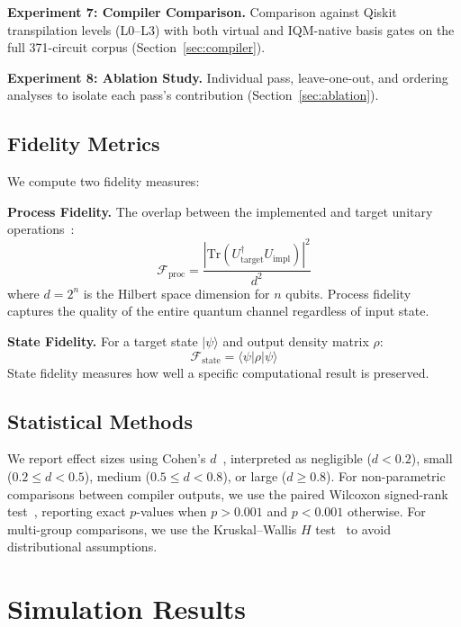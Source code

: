 \documentclass[sigconf,nonacm]{acmart}
\newcommand{\ket}[1]{|#1\rangle}
\newcommand{\bra}[1]{\langle#1|}
\newcommand{\fid}{\mathcal{F}}
\begin{document}
\textbf{Experiment 7: Compiler Comparison.} Comparison against Qiskit transpilation levels (L0--L3) with both virtual and IQM-native basis gates on the full 371-circuit corpus (Section~\ref{sec:compiler}).

\textbf{Experiment 8: Ablation Study.} Individual pass, leave-one-out, and ordering analyses to isolate each pass's contribution (Section~\ref{sec:ablation}).

\subsection{Fidelity Metrics}

We compute two fidelity measures:

\textbf{Process Fidelity.} The overlap between the implemented and target unitary operations~\cite{nielsen2010quantum}:
\begin{equation}
    \fid_{\text{proc}} = \frac{|\text{Tr}(U_{\text{target}}^{\dagger} U_{\text{impl}})|^2}{d^2}
\end{equation}
where $d = 2^n$ is the Hilbert space dimension for $n$ qubits. Process fidelity captures the quality of the entire quantum channel regardless of input state.

\textbf{State Fidelity.} For a target state $\ket{\psi}$ and output density matrix $\rho$:
\begin{equation}
    \fid_{\text{state}} = \bra{\psi}\rho\ket{\psi}
\end{equation}
State fidelity measures how well a specific computational result is preserved.

\subsection{Statistical Methods}

We report effect sizes using Cohen's $d$~\cite{cohen1988statistical}, interpreted as negligible ($d < 0.2$), small ($0.2 \leq d < 0.5$), medium ($0.5 \leq d < 0.8$), or large ($d \geq 0.8$). For non-parametric comparisons between compiler outputs, we use the paired Wilcoxon signed-rank test~\cite{wilcoxon1945individual}, reporting exact $p$-values when $p > 0.001$ and $p < 0.001$ otherwise. For multi-group comparisons, we use the Kruskal--Wallis $H$ test~\cite{kruskal1952use} to avoid distributional assumptions.

\section{Simulation Results}
\label{sec:results}
\end{document}
